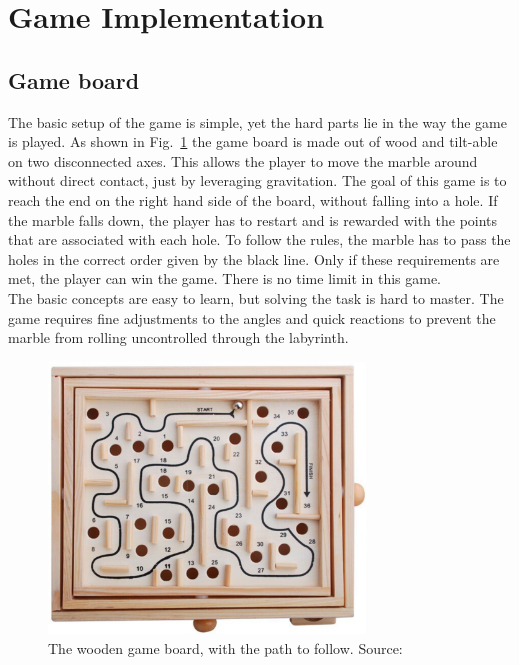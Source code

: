 
\section{Game Implementation}\label{sec:game-implementation}

\subsection{Game board}\label{subsec:game-board}
The basic setup of the game is simple, yet the hard parts lie in the way the game is played.
As shown in Fig.~\ref{fig:wooden_board} the game board is made out of wood and tilt-able on two disconnected axes.
This allows the player to move the marble around without direct contact, just by leveraging gravitation.
The goal of this game is to reach the end on the right hand side of the board, without falling into a hole.
If the marble falls down, the player has to restart and is rewarded with the points that are associated with each hole.
To follow the rules, the marble has to pass the holes in the correct order given by the black line.
Only if these requirements are met, the player can win the game.
There is no time limit in this game.\\
The basic concepts are easy to learn, but solving the task is hard to master.
The game requires fine adjustments to the angles and quick reactions to prevent the marble from rolling uncontrolled through
the labyrinth.

\begin{figure}[h]
    \centering
    \includegraphics[width=0.75\textwidth]{images/wooden_game_board}
    \caption{The wooden game board, with the path to follow. Source:~\cite{wooden_board}
    }
    \label{fig:wooden_board}
\end{figure}
